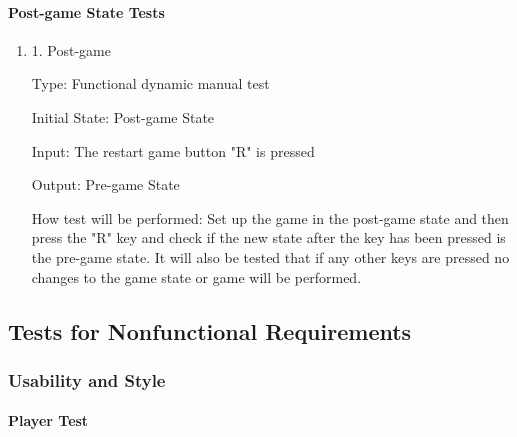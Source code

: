 \documentclass[12pt, titlepage]{article}
\begin{document}
\paragraph{Post-game State Tests}
\begin{enumerate}

\item{1. Post-game \\}

Type: Functional dynamic manual test

Initial State: Post-game State

Input: The restart game button "R" is pressed

Output: Pre-game State

How test will be performed: Set up the game in the post-game state and then press the "R" key and check if the new state after the key has been pressed is the pre-game state. It will also be tested that if any other keys are pressed no changes to the game state or game will be performed.
\end{enumerate}


\subsection{Tests for Nonfunctional Requirements}

\subsubsection{Usability and Style}

\paragraph{Player Test}
\end{document}

